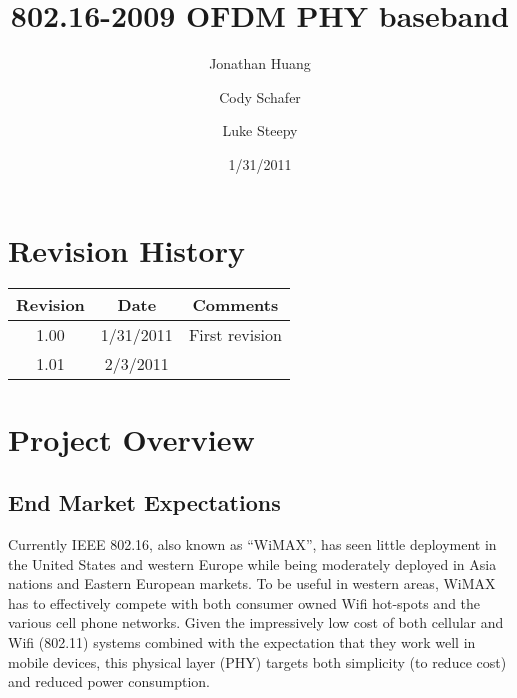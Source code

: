 \documentclass[10pt]{article}
\title{802.16-2009 OFDM PHY baseband}
\author{Jonathan Huang \and Cody Schafer \and Luke Steepy}
\date{1/31/2011}
\begin{document}
\maketitle 
\section{Revision History}
\begin{tabular}{|c|c|c|}
\hline
Revision & Date & Comments \\ \hline
1.00 & 1/31/2011 & First revision \\ \hline
1.01 & 2/3/2011 & \\ \hline
\end{tabular}
\section{Project Overview}
\subsection{End Market Expectations}
Currently IEEE 802.16, also known as “WiMAX”, has seen little deployment in the United States and western Europe while being moderately deployed in Asia nations and Eastern European markets. To be useful in western areas, WiMAX has to effectively compete with both consumer owned Wifi hot-spots and the various cell phone networks. Given the impressively low cost of both cellular and Wifi (802.11) systems combined with the expectation that they work well in mobile devices, this physical layer (PHY) targets both simplicity (to reduce cost) and reduced power consumption.
\end{document}
